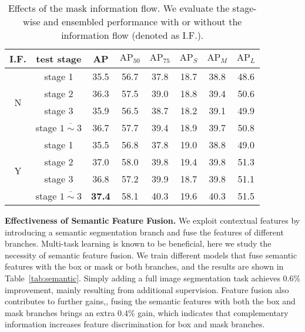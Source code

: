 \documentclass[10pt,twocolumn,letterpaper]{article}
\begin{document}
\begin{table}[htb]
	\centering
	\caption{Effects of the mask information flow. We evaluate the stage-wise and ensembled performance with or without the information flow (denoted as I.F.).}
	\addtolength{\tabcolsep}{-2pt}
	\begin{tabular}{*{8}{c}}
		\toprule
		I.F. & test stage & AP & $\text{AP}_{50}$ & $\text{AP}_{75}$ & $\text{AP}_{S}$ & $\text{AP}_{M}$ & $\text{AP}_{L}$ \\
		\midrule
		\multirow{4}{*}{N} & stage 1    & 35.5 & 56.7 & 37.8 & 18.7 & 38.8 & 48.6 \\
		       & stage 2    & 36.3 & 57.5 & 39.0 & 18.8 & 39.4 & 50.6 \\
		       & stage 3    & 35.9 & 56.5 & 38.7 & 18.2 & 39.1 & 49.9 \\
		       & stage $\overline{1\sim3}$ & 36.7 & 57.7 & 39.4 & 18.9 & 39.7 & 50.8 \\
		\midrule
		\multirow{4}{*}{Y} & stage 1    & 35.5 & 56.8 & 37.8 & 19.0 & 38.8 & 49.0 \\
		       & stage 2    & 37.0 & 58.0 & 39.8 & 19.4 & 39.8 & 51.3 \\
		       & stage 3    & 36.8 & 57.2 & 39.9 & 18.7 & 39.8 & 51.1 \\
		       & stage $\overline{1\sim3}$ & \textbf{37.4} & 58.1 & 40.3 & 19.6 & 40.3 & 51.5 \\
		\bottomrule
	\end{tabular}
	\label{tab:mask-info-stagewise}
\end{table}

\noindent\textbf{Effectiveness of Semantic Feature Fusion.}
We exploit contextual features by introducing a semantic segmentation branch and fuse the features of different branches.
Multi-task learning is known to be beneficial, here we study the necessity of semantic feature fusion.
We train different models that fuse semantic features with the box or mask or both branches,
and the results are shown in Table~\ref{tab:semantic}.
Simply adding a full image segmentation task achieves $0.6\%$ improvement, mainly resulting from additional supervision.
Feature fusion also contributes to further gains,\eg, fusing the semantic features
with both the box and mask branches brings an extra $0.4\%$ gain, which indicates that complementary information increases feature discrimination for box and mask branches.
\end{document}
